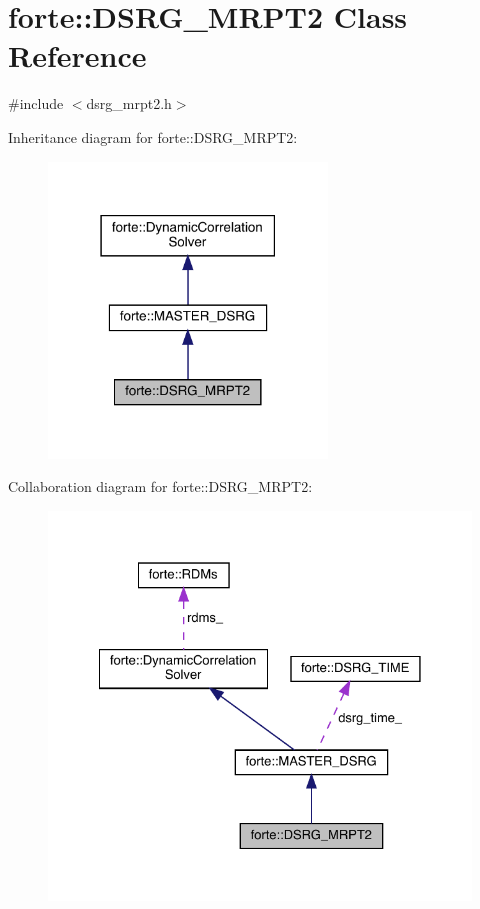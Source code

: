 \hypertarget{classforte_1_1_d_s_r_g___m_r_p_t2}{}\section{forte\+:\+:D\+S\+R\+G\+\_\+\+M\+R\+P\+T2 Class Reference}
\label{classforte_1_1_d_s_r_g___m_r_p_t2}


{\ttfamily \#include $<$dsrg\+\_\+mrpt2.\+h$>$}



Inheritance diagram for forte\+:\+:D\+S\+R\+G\+\_\+\+M\+R\+P\+T2\+:
\nopagebreak
\begin{figure}[H]
\begin{center}
\leavevmode
\includegraphics[width=210pt]{classforte_1_1_d_s_r_g___m_r_p_t2__inherit__graph}
\end{center}
\end{figure}


Collaboration diagram for forte\+:\+:D\+S\+R\+G\+\_\+\+M\+R\+P\+T2\+:
\nopagebreak
\begin{figure}[H]
\begin{center}
\leavevmode
\includegraphics[width=328pt]{classforte_1_1_d_s_r_g___m_r_p_t2__coll__graph}
\end{center}
\end{figure}
